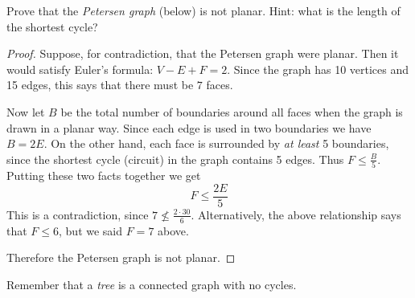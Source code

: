 \begin{questions}
\begin{parts}
\end{parts}

\question Prove that the {\em Petersen graph} (below) is not planar.  Hint: what is the length of the shortest cycle?

\begin{center}
\end{center}

\begin{solution}
  \begin{proof}
    Suppose, for contradiction, that the Petersen graph were planar.  Then it would satisfy Euler's formula: $V - E + F = 2$.  Since the graph has 10 vertices and 15 edges, this says that there must be $7$ faces.  
    
    Now let $B$ be the total number of boundaries around all faces when the graph is drawn in a planar way.  Since each edge is used in two boundaries we have $B = 2E$.  On the other hand, each face is surrounded by {\em at least} 5 boundaries, since the shortest cycle (circuit) in the graph contains 5 edges.  Thus $F \le \frac{B}{5}$.  Putting these two facts together we get
    \[F \le \frac{2E}{5}\]
    This is a contradiction, since $7 \not\le \frac{2\cdot 30}{6}$.  Alternatively, the above relationship says that $F \le 6$, but we said $F = 7$ above.
    
    Therefore the Petersen graph is not planar.
  \end{proof}

\end{solution}


\question Remember that a {\em tree} is a connected graph with no cycles.
\end{questions}
